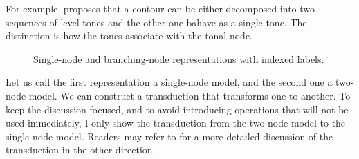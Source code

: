 For example, \citet{yip1989contour} proposes that a contour can be either decomposed 
into two sequences of level tones and the other one bahave as a single tone. 
The distinction is how the tones associate with the tonal node. 
\begin{figure}[ht]
    \centering

    \begin{minipage}[b]{0.4\textwidth}
        \centering
    \end{minipage}
    \hspace{2em}
    \begin{minipage}[b]{0.4\textwidth}
        \centering
        
    \end{minipage}

    \caption{Single-node and branching-node representations with indexed labels.}
\end{figure}


Let us call the first representation a single-node model, and the second one 
a two-node model. We can construct a transduction that transforms one to 
another. To keep the discussion focused, and to avoid introducing
operations that will not be used immediately, I only show the transduction from
the two-node model to the single-node model. Readers may refer to
\citep{oakdenNotationalEquivalenceTonal2020} for a more detailed discussion of
the transduction in the other direction.


